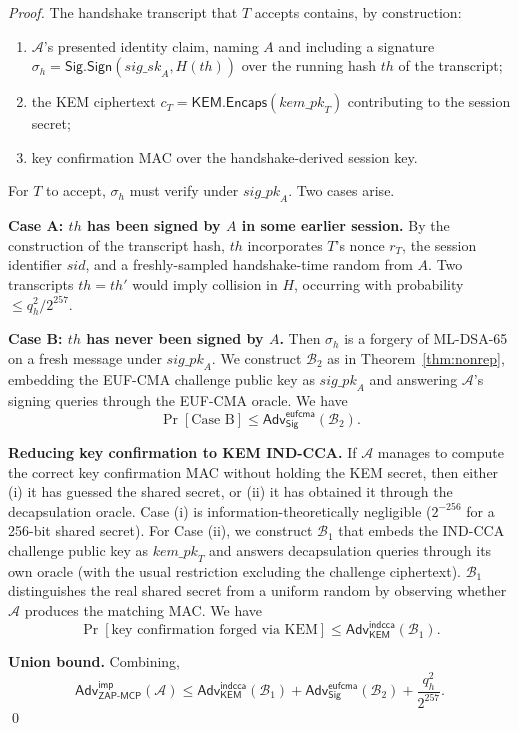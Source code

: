 \documentclass[11pt,a4paper]{article}
\theoremstyle{definition}
\theoremstyle{remark}
\newcommand{\zapmcp}{\textsf{ZAP-MCP}\xspace}
\newcommand{\Adv}{\mathsf{Adv}}
\newcommand{\KEM}{\textsf{KEM}}
\newcommand{\Sign}{\textsf{Sig}}
\begin{document}
\begin{proof}
The handshake transcript that $T$ accepts contains, by construction:
\begin{enumerate}[leftmargin=2em,itemsep=0.2em]
\item $\mathcal{A}$'s presented identity claim, naming $A$ and
including a signature
$\sigma_h = \Sign.\mathsf{Sign}(\mathit{sig\_sk}_A, H(\mathit{th}))$
over the running hash $\mathit{th}$ of the transcript;
\item the KEM ciphertext $c_T = \KEM.\mathsf{Encaps}(\mathit{kem\_pk}_T)$
contributing to the session secret;
\item key confirmation MAC over the handshake-derived session key.
\end{enumerate}
For $T$ to accept, $\sigma_h$ must verify under
$\mathit{sig\_pk}_A$. Two cases arise.

\textbf{Case A: $\mathit{th}$ has been signed by $A$ in some earlier
session.} By the construction of the transcript hash, $\mathit{th}$
incorporates $T$'s nonce $r_T$, the session identifier
$\mathit{sid}$, and a freshly-sampled handshake-time random from $A$.
Two transcripts $\mathit{th} = \mathit{th}'$ would imply collision in
$H$, occurring with probability $\leq q_h^2 / 2^{257}$.

\textbf{Case B: $\mathit{th}$ has never been signed by $A$.} Then
$\sigma_h$ is a forgery of ML-DSA-65 on a fresh message under
$\mathit{sig\_pk}_A$. We construct $\mathcal{B}_2$ as in
Theorem~\ref{thm:nonrep}, embedding the EUF-CMA challenge public key
as $\mathit{sig\_pk}_A$ and answering $\mathcal{A}$'s signing queries
through the EUF-CMA oracle. We have
\[
\Pr[\text{Case B}] \leq \Adv^{\mathsf{eufcma}}_{\Sign}(\mathcal{B}_2).
\]

\textbf{Reducing key confirmation to KEM IND-CCA.} If $\mathcal{A}$
manages to compute the correct key confirmation MAC without holding
the KEM secret, then either (i) it has guessed the shared secret, or
(ii) it has obtained it through the decapsulation oracle. Case (i) is
information-theoretically negligible ($2^{-256}$ for a 256-bit
shared secret). For Case (ii), we construct $\mathcal{B}_1$ that
embeds the IND-CCA challenge public key as $\mathit{kem\_pk}_T$ and
answers decapsulation queries through its own oracle (with the usual
restriction excluding the challenge ciphertext). $\mathcal{B}_1$
distinguishes the real shared secret from a uniform random by
observing whether $\mathcal{A}$ produces the matching MAC. We have
\[
\Pr[\text{key confirmation forged via KEM}] \leq
\Adv^{\mathsf{indcca}}_{\KEM}(\mathcal{B}_1).
\]

\textbf{Union bound.} Combining,
\[
\Adv^{\mathsf{imp}}_{\zapmcp{}}(\mathcal{A}) \leq
\Adv^{\mathsf{indcca}}_{\KEM}(\mathcal{B}_1) +
\Adv^{\mathsf{eufcma}}_{\Sign}(\mathcal{B}_2) +
\frac{q_h^2}{2^{257}}.
\]
\qed
\end{proof}
\end{document}
